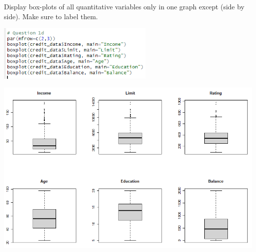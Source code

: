 Display box-plots of all quantitative variables only in one graph except  (side by side). Make
sure to label them.

\noindent \includegraphics[width=3in]{r_1d-1.PNG}

\noindent \includegraphics[width=6in]{r_1d-2.PNG}